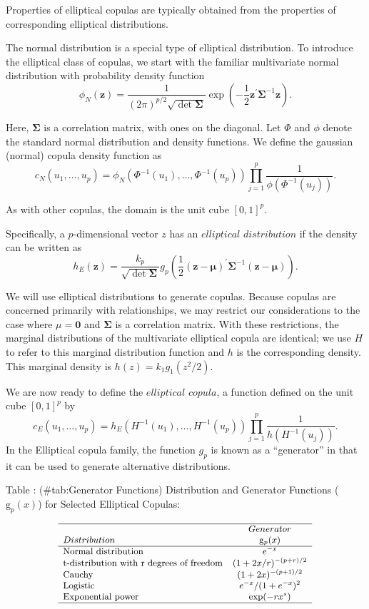 \documentclass[]{book}
\theoremstyle{definition}
\theoremstyle{definition}
\theoremstyle{definition}
\theoremstyle{remark}
\begin{document}
Properties of elliptical copulas are typically obtained from the
properties of corresponding elliptical
distributions\citep{yan2017elements}.

The normal distribution is a special type of elliptical distribution. To
introduce the elliptical class of copulas, we start with the familiar
multivariate normal distribution with probability density function
\[\phi_N (\mathbf{z})= \frac{1}{(2 \pi)^{p/2}\sqrt{\det \boldsymbol \Sigma}}
\exp\left( -\frac{1}{2} \mathbf{z}^{\prime} \boldsymbol
\Sigma^{-1}\mathbf{z}\right).\]

Here, \(\boldsymbol \Sigma\) is a correlation matrix, with ones on the
diagonal. Let \(\Phi\) and \(\phi\) denote the standard normal
distribution and density functions. We define the gaussian (normal)
copula density function as
\[{c}_N(u_1,  \ldots, u_p) = \phi_N \left(\Phi^{-1}(u_1),
\ldots, \Phi^{-1}(u_p) \right) \prod_{j=1}^p
\frac{1}{\phi(\Phi^{-1}(u_j))}.\]

As with other copulas, the domain is the unit cube \([0,1]^p\).

Specifically, a \(p\)-dimensional vector \({z}\) has an \({elliptical}\)
\({distribution}\) if the density can be written as
\[h_E (\mathbf{z})= \frac{k_p}{\sqrt{\det \boldsymbol \Sigma}}
g_p \left( \frac{1}{2} (\mathbf{z}- \boldsymbol \mu)^{\prime}
\boldsymbol \Sigma^{-1}(\mathbf{z}- \boldsymbol \mu) \right).\]

We will use elliptical distributions to generate copulas. Because
copulas are concerned primarily with relationships, we may restrict our
considerations to the case where \(\mu = \mathbf{0}\) and
\(\boldsymbol \Sigma\) is a correlation matrix. With these restrictions,
the marginal distributions of the multivariate elliptical copula are
identical; we use \(H\) to refer to this marginal distribution function
and \(h\) is the corresponding density. This marginal density is
\(h(z) = k_1 g_1(z^2/2).\)

We are now ready to define the \(elliptical\) \(copula\), a function
defined on the unit cube \([0,1]^p\) by
\[{c}_E(u_1,  \ldots, u_p) = h_E \left(H^{-1}(u_1), \ldots,
H^{-1}(u_p) \right) \prod_{j=1}^p \frac{1}{h(H^{-1}(u_j))}.\] In the
Elliptical copula family, the function \(g_p\) is known as a
``generator'' in that it can be used to generate alternative
distributions.

Table : (\#tab:Generator Functions) Distribution and Generator Functions
(\(\mathrm{g}_p(x)\)) for Selected Elliptical Copulas:

\[
\small\begin{array}{lc}
\hline & Generator \\
 Distribution &  \mathrm{g}_p(x)  \\
\hline
 \text{Normal distribution} &  e^{-x}\\
 \text{t-distribution with r degrees of freedom} &   (1+2x/r)^{-(p+r)/2}\\
 \text{Cauchy} &  (1+2x)^{-(p+1)/2}\\
\text{Logistic} &  e^{-x}/(1+e^{-x})^2\\
 \text{Exponential power} &   \exp(-rx^s)\\
\hline
\end{array}
\]
\end{document}
